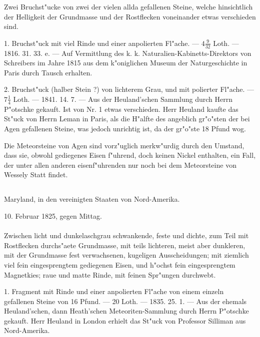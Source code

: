 \documentclass[a4paper, 11pt, oneside, polutonikogreek, german]{article}
\begin{document}
Zwei Bruchst"ucke von zwei der vielen allda gefallenen Steine, welche hinsichtlich der Helligkeit der Grundmasse und der Rostflecken voneinander etwas verschieden sind.

1. Bruchst"uck mit viel Rinde und einer anpolierten Fl"ache. --- $\mathfrak{4\frac{9}{32}}$ Loth. --- 1816. 31. 33. e. --- Auf Vermittlung des k. k. Naturalien-Kabinetts-Direktors von Schreibers im Jahre 1815 aus dem k"oniglichen Museum der Naturgeschichte in Paris durch Tausch erhalten.

2. Bruchst"uck (halber Stein ?) von lichterem Grau, und mit polierter Fl"ache. --- $\mathfrak{7\frac{1}{4}}$ Loth. --- 1841. 14. 7. --- Aus der Heuland'schen Sammlung durch Herrn P"otschke gekauft. Ist von Nr. 1 etwas verschieden. Herr Heuland kaufte das St"uck von Herrn Leman in Paris, als die H"alfte des angeblich gr"o"sten der bei Agen gefallenen Steine, was jedoch unrichtig ist, da der gr"o"ste 18 Pfund wog.

\setlength{\leftskip}{10mm}
\setlength{\parindent}{0pt}

{\footnotesize Die Meteorsteine von Agen sind vorz"uglich merkw"urdig durch den Umstand, dass sie, obwohl gediegenes Eisen f"uhrend, doch keinen Nickel enthalten, ein Fall, der unter allen anderen eisenf"uhrenden nur noch bei dem Meteorsteine von Wessely Statt findet.}

\setlength{\leftskip}{0pt}
\setlength{\parindent}{20pt}

\subsection{}
\begin{center}

Maryland, in den vereinigten Staaten von Nord-Amerika.

10. Februar 1825, gegen Mittag.
\end{center}
\paragraph{}
Zwischen licht und dunkelaschgrau schwankende, feste und dichte, zum Teil mit Rostflecken durchs"aete Grundmasse, mit teils lichteren, meist aber dunkleren, mit der Grundmasse fest verwachsenen, kugeligen Ausscheidungen; mit ziemlich viel fein eingesprengtem gediegenen Eisen, und h"ochst fein eingesprengtem Magnetkies; raue und matte Rinde, mit feinen Spr"ungen durchwebt.

1. Fragment mit Rinde und einer anpolierten Fl"ache von einem einzeln gefallenen Steine von 16 Pfund. --- 20 Loth. --- 1835. 25. 1. --- Aus der ehemals Heuland'schen, dann Heath'schen Meteoriten-Sammlung durch Herrn P"otschke gekauft. Herr Heuland in London erhielt das St"uck von Professor Silliman aus Nord-Amerika.
\end{document}
